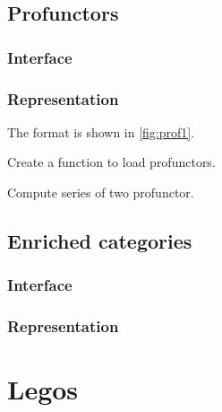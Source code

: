 \section{Profunctors}




\label{sec:exercises-profunctors}

\subsection*{Interface}


\subsection*{Representation}

The format is shown in \cref{fig:prof1}.




\begin{exercise}
Create a function to load profunctors.

%

\end{exercise}


\begin{exercise}
Compute series of two profunctor.
%
\end{exercise}


\section{Enriched categories}

\subsection*{Interface}


\subsection*{Representation}


\chapter{Legos}
\label{ch:exercises-legos}


